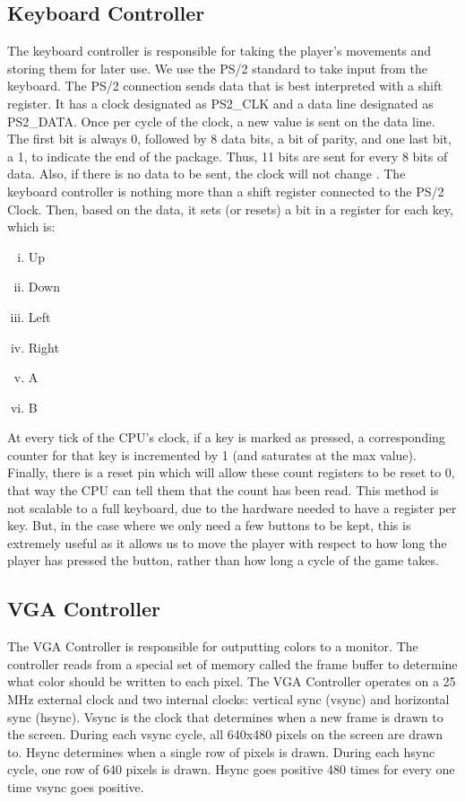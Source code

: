 \documentclass[onecolumn]{IEEEtran}
\begin{document}
\subsection{Keyboard Controller}
The keyboard controller is responsible for taking the player's movements and storing them for later use. We use the PS/2 standard to take input from the keyboard. The PS/2 connection sends data that is best interpreted with a shift register. It has a clock designated as PS2\_CLK and a data line designated as PS2\_DATA. Once per cycle of the clock, a new value is sent on the data line. The first bit is always 0, followed by 8 data bits, a bit of parity, and one last bit, a 1, to indicate the end of the package. Thus, 11 bits are sent for every 8 bits of data. Also, if there is no data to be sent, the clock will not change \cite{ps2}. The keyboard controller is nothing more than a shift register connected to the PS/2 Clock. Then, based on the data, it sets (or resets) a bit in a register for each key, which is:
\begin{enumerate}[i)]
	\item Up
	\item Down
	\item Left
	\item Right
	\item A
	\item B
\end{enumerate}

At every tick of the CPU's clock, if a key is marked as pressed, a corresponding counter for that key is incremented by 1 (and saturates at the max value). Finally, there is a reset pin which will allow these count registers to be reset to 0, that way the CPU can tell them that the count has been read. This method is not scalable to a full keyboard, due to the hardware needed to have a register per key. But, in the case where we only need a few buttons to be kept, this is extremely useful as it allows us to move the player with respect to how long the player has pressed the button, rather than how long a cycle of the game takes.

\subsection{VGA Controller}
The VGA Controller is responsible for outputting colors to a monitor.  The controller reads from a special set of memory called the frame buffer to determine what color should be written to each pixel.  The VGA Controller operates on a 25 MHz external clock and two internal clocks: vertical sync (vsync) and horizontal sync (hsync).  Vsync is the clock that determines when a new frame is drawn to the screen.  During each vsync cycle, all 640x480 pixels on the screen are drawn to.  Hsync determines when a single row of pixels is drawn.  During each hsync cycle, one row of 640 pixels is drawn.  Hsync goes positive 480 times for every one time vsync goes positive.
\end{document}
